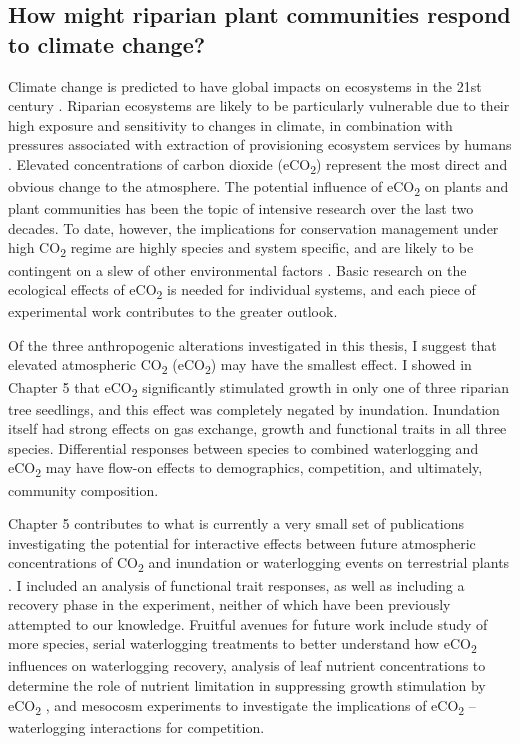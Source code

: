 {{\subsection{How might riparian plant communities respond to climate change?}
Climate change is predicted to have global impacts on ecosystems in the 21st century \citep{IPCC2014}. Riparian ecosystems are likely to be particularly vulnerable due to their high exposure and sensitivity to changes in climate, in combination with pressures associated with extraction of provisioning ecosystem services by humans \citep{Capon2013}. Elevated concentrations of carbon dioxide (eCO\textsubscript{2}) represent the most direct and obvious change to the atmosphere. The potential influence of eCO\textsubscript{2} on plants and plant communities has been the topic of intensive research over the last two decades. To date, however, the implications for conservation management under high CO\textsubscript{2} regime are highly species and system specific, and are likely to be contingent on a slew of other environmental factors \citep{Poorter2003a, Norby2011, Poorter2011, Reich2014}. Basic research on the ecological effects of eCO\textsubscript{2} is needed for individual systems, and each piece of experimental work contributes to the greater outlook.

Of the three anthropogenic alterations investigated in this thesis, I suggest that elevated atmospheric CO\textsubscript{2} (eCO\textsubscript{2}) may have the smallest effect. I showed in Chapter 5 that eCO\textsubscript{2} significantly stimulated growth in only one of three riparian tree seedlings, and this effect was completely negated by inundation. Inundation itself had strong effects on gas exchange, growth and functional traits in all three species. Differential responses between species to combined waterlogging and eCO\textsubscript{2} may have flow-on effects to demographics, competition, and ultimately, community composition.
 
Chapter 5 contributes to what is currently a very small set of publications investigating the potential for interactive effects between future atmospheric concentrations of CO\textsubscript{2} and inundation or waterlogging events on terrestrial plants \citep{Megonigal2005, Shimono2012, Arenque2014}. I included an analysis of functional trait responses, as well as including a recovery phase in the experiment, neither of which have been previously attempted to our knowledge. Fruitful avenues for future work include study of more species, serial waterlogging treatments to better understand how eCO\textsubscript{2} influences on waterlogging recovery, analysis of leaf nutrient concentrations to determine the role of nutrient limitation in suppressing growth stimulation by eCO\textsubscript{2} \citep{Reich2014}, and mesocosm experiments to investigate the implications of eCO\textsubscript{2} – waterlogging interactions for competition.

}}
